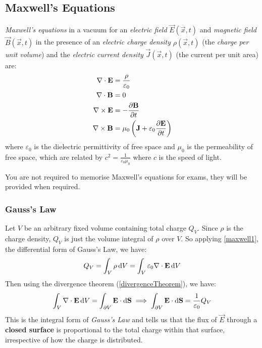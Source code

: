 \documentclass[../main.tex]{subfiles}
\begin{document}
\subsection{Maxwell's Equations}
\begin{definition}
  \textit{Maxwell's equations} in a vacuum for an \textit{electric field} $\vec{E}(\vec{x}, t)$ and \textit{magnetic field} $\vec{B}(\vec{x}, t)$ in the presence of an \textit{electric charge density} $\rho(\vec{x}, t)$ (the \textit{charge per unit volume}) and the \textit{electric current density} $\vec{J}(\vec{x}, t)$ (the current per unit area) are:
  \begin{align}
    \nabla \cdot \vec{E} &= \frac{\rho}{\varepsilon_0} \label{maxwell1} \\
    \nabla \cdot \vec{B} &= 0 \label{maxwell2} \\
    \nabla \times \vec{E} &= -\pderiv{\vec{B}}{t} \label{maxwell3} \\
    \nabla \times \vec{B} &= \mu_0\left(\vec{J} + \varepsilon_0 \pderiv{\vec{E}}{t}\right) \label{maxwell4}
  \end{align}
  where $\varepsilon_0$ is the dielectric permittivity of free space and $\mu_0$ is the permeability of free space, which are related by $c^2 = \frac{1}{\varepsilon_0 \mu_0}$ where $c$ is the speed of light.
\end{definition}
\begin{remark}[Exams]
  You are not required to memorise Maxwell's equations for exams, they will be provided when required.
\end{remark}
\subsubsection{Gauss's Law}
Let $V$ be an arbitrary fixed volume containing total charge $Q_V$.
Since $\rho$ is the charge density, $Q_V$ is just the volume integral of $\rho$ over $V$.
So applying \cref{maxwell1}, the differential form of Gauss's Law, we have:
\[
  Q_V = \int_{V} \rho \d{V} = \int_{V} \varepsilon_0 \nabla \cdot \vec{E} \d{V}
\]
Then using the divergence theorem (\cref{divergenceTheorem}), we have:
\[
  \int_{V} \nabla \cdot \vec{E} \d{V} = \int_{\partial V} \vec{E} \cdot \d{\vec{S}} \implies \int_{\partial V} \vec{E} \cdot \d{\vec{S}} = \frac{1}{\varepsilon_0}Q_V
\]
This is the integral form of \textit{Gauss's Law} and tells us that the flux of $\vec{E}$ through a \textbf{closed surface} is proportional to the total charge within that surface, irrespective of how the charge is distributed.
\end{document}
